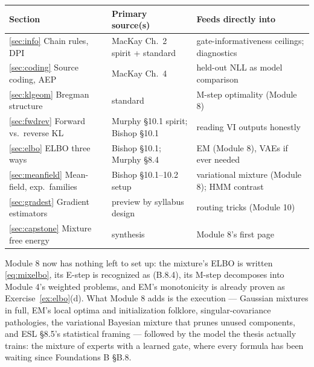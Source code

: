 \documentclass[11pt]{article}
\numberwithin{equation}{section}
\theoremstyle{plain}
\theoremstyle{definition}
\theoremstyle{remark}
\begin{document}
\begin{center}
\small
\begin{tabular}{@{}lll@{}}
\toprule
Section & Primary source(s) & Feeds directly into \\
\midrule
\ref{sec:info} Chain rules, DPI & MacKay Ch.\ 2 spirit + standard & gate-informativeness ceilings; diagnostics \\
\ref{sec:coding} Source coding, AEP & MacKay Ch.\ 4 & held-out NLL as model comparison \\
\ref{sec:klgeom} Bregman structure & standard & M-step optimality (Module 8) \\
\ref{sec:fwdrev} Forward vs.\ reverse KL & Murphy \S10.1 spirit; Bishop \S10.1 & reading VI outputs honestly \\
\ref{sec:elbo} ELBO three ways & Bishop \S10.1; Murphy \S8.4 & EM (Module 8), VAEs if ever needed \\
\ref{sec:meanfield} Mean-field, exp.\ families & Bishop \S10.1--10.2 setup & variational mixture (Module 8); HMM contrast \\
\ref{sec:gradest} Gradient estimators & preview by syllabus design & routing tricks (Module 10) \\
\ref{sec:capstone} Mixture free energy & synthesis & Module 8's first page \\
\bottomrule
\end{tabular}
\end{center}

\medskip
Module 8 now has nothing left to set up: the mixture's ELBO is written \eqref{eq:mixelbo}, its E-step is recognized as (B.8.4), its M-step decomposes into Module 4's weighted problems, and EM's monotonicity is already proven as Exercise~\ref{ex:elbo}(d). What Module 8 adds is the execution --- Gaussian mixtures in full, EM's local optima and initialization folklore, singular-covariance pathologies, the variational Bayesian mixture that prunes unused components, and ESL \S8.5's statistical framing --- followed by the model the thesis actually trains: the mixture of experts with a learned gate, where every formula has been waiting since Foundations B \S B.8.
\end{document}
